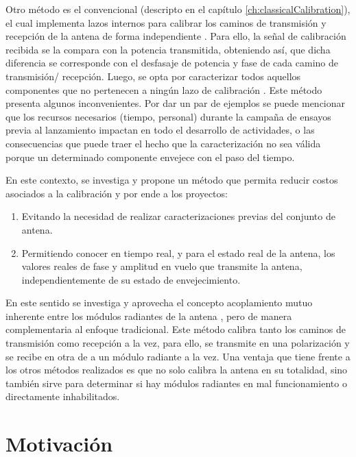 Otro método es el convencional (descripto en el capítulo \ref{ch:classicalCalibration}), el cual implementa lazos internos
para calibrar los caminos de transmisión y recepción de la antena de forma independiente \cite{Makhoul2012}
\cite{Luscombe1990}\cite{Seifert1996}\cite{Dall1994}\cite{Freeman1995}\cite{Bibby2003}\cite{Bast2003}\cite{Stove2004}
\cite{Srivastava1996}\cite{Wang2010}. Para ello, la señal de calibración recibida se la compara con la potencia transmitida,
obteniendo así, que dicha diferencia se corresponde con el desfasaje de potencia y fase de cada camino de transmisión/
recepción. Luego, se opta por caracterizar todos aquellos componentes que no pertenecen a ningún lazo de calibración
\cite{Freeman1995}. Este método presenta algunos inconvenientes. Por dar un par de ejemplos se puede mencionar que los recursos
necesarios (tiempo, personal) durante la campaña de ensayos previa al lanzamiento impactan en todo el desarrollo de actividades,
o las consecuencias que puede traer el hecho que la caracterización no sea válida porque un determinado componente
envejece con el paso del tiempo.

En este contexto, se investiga y propone un método que permita reducir costos asociados a la calibración y por ende a los
proyectos:

\begin{enumerate}
    \item Evitando la necesidad de realizar caracterizaciones previas del conjunto de antena.
    \item Permitiendo conocer en tiempo real, y para el estado real de la antena, los valores reales de fase y amplitud en
		vuelo que transmite la antena, independientemente de su estado de envejecimiento.
\end{enumerate}

En este sentido se investiga y aprovecha el concepto acoplamiento mutuo inherente entre los módulos radiantes de la antena
\cite{Aumann1989}, pero de manera complementaria al enfoque tradicional. Este método calibra tanto los caminos de transmisión
como recepción a la vez, para ello, se transmite en una polarización y se recibe en otra de a un módulo radiante a la vez.
Una ventaja que tiene frente a los otros métodos realizados es que no solo calibra la antena en su totalidad, sino también
sirve para determinar si hay módulos radiantes en mal funcionamiento o directamente inhabilitados.

\section{Motivación} \label{sc:motivation}

